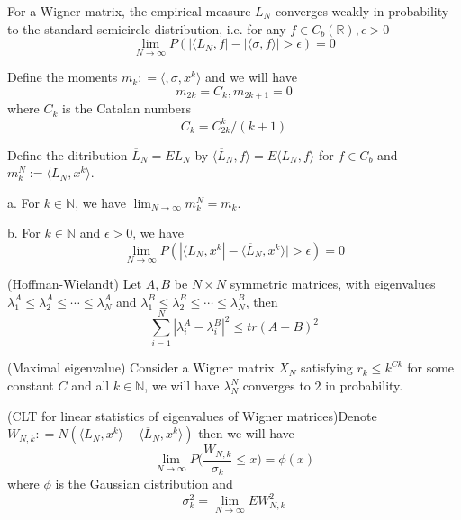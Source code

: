 \documentclass[lang=en, color=blue, ]{elegantbook}
\newcommand{\R}{\mathbb{R}}
\newcommand{\N}{\mathbb{N}}
\newcommand{\EL}{\overline{L}}
\begin{document}
\begin{theorem}
    For a Wigner matrix, the empirical measure $L_N$ converges weakly in probability to the standard semicircle distribution, i.e. for any $f\in C_b(\R),\epsilon > 0$
    \[
    \lim_{N\to\infty}P(|\langle L_N,f|-|\langle \sigma,f\rangle| > \epsilon) = 0
    \]
\end{theorem}

\begin{theorem}
    Define the moments $m_k : = \langle ,\sigma,x^k\rangle$ and we will have
    \[m_{2k} = C_k, m_{2k+1} = 0\]
    where $C_k$ is the Catalan numbers
    \[
    C_k = C_{2k}^k/(k+1)
    \]
\end{theorem}

\begin{definition}
    Define the ditribution $\EL_N = EL_N$ by $\langle \EL_N, f\rangle = E\langle L_N,f\rangle$ for $f\in C_b$ and $m_k^N := \langle \EL_N, x^k\rangle $.
\end{definition}

\begin{lemma}
    a. For $k\in \N$, we have $\lim_{N\to\infty} m_k^N = m_k$.\par
    b. For $k\in \N$ and $\epsilon > 0$, we have
    \[\lim_{N\to\infty} P(|\langle L_N, x^k| - \langle \EL_N,x^k\rangle | > \epsilon) = 0\]
\end{lemma}

\begin{lemma}
    (Hoffman-Wielandt) Let $A,B$ be $N\times N$ symmetric matrices, with eigenvalues $\lambda_1^A \leq \lambda_2^A \leq \cdots \leq \lambda_N^A$ and $\lambda_1^B \leq \lambda_2^B \leq \cdots \leq \lambda_N^B$, then
    \[\sum\limits_{i=1}^N|\lambda_i^A - \lambda_i^B|^2 \leq tr(A-B)^2\]
\end{lemma}

\begin{theorem}
    (Maximal eigenvalue) Consider a Wigner matrix $X_N$ satisfying $r_k \leq k^{Ck}$ for some constant $C$ and all $k\in\N$, we will have $\lambda_N^N$ converges to $2$ in probability.
\end{theorem}

\begin{theorem}
    (CLT for linear statistics of eigenvalues of Wigner matrices)Denote $W_{N,k} : = N(\langle L_N,x^k\rangle - \langle \EL_N,x^k\rangle)$ then we will have
    \[
    \lim_{N\to\infty}P\Big(\dfrac{W_{N,k}}{\sigma_k} \leq x\Big) = \phi(x)
    \]
    where $\phi$ is the Gaussian distribution and
    \[
    \sigma^2_k = \lim_{N\to\infty}EW_{N,k}^2
    \]
\end{theorem}
\end{document}
